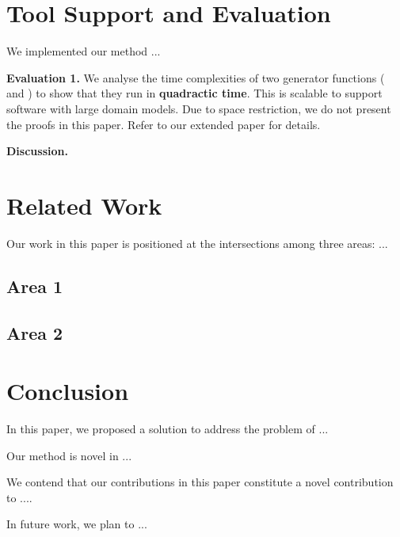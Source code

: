 \documentclass[runningheads]{llncs}
\begin{document}
%
\section{Tool Support and Evaluation} \label{sect:evaluation}
We implemented our method ...

\textbf{\textbf{Evaluation 1.}}
We analyse the time complexities of two generator functions ( and ) to show that they run in \textbf{quadractic time}. This is scalable to support software with large domain models. Due to space restriction, we do not present the proofs in this paper. Refer to our extended paper for details.

\textbf{\textbf{Discussion.}}

%
\section{Related Work} \label{sect:relatedwork}
Our work in this paper is positioned at the intersections among three areas: ...


\subsection*{Area 1}

\subsection*{Area 2}

%
\section{Conclusion} \label{sect:conclusion}
In this paper, we proposed a solution to address the problem of ...

%
Our method is novel in ...

We contend that our contributions in this paper constitute a novel contribution to ....

In future work, we plan to ...



\end{document}
